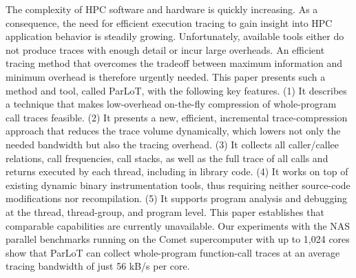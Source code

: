 The complexity of HPC software and hardware is quickly increasing. As a consequence, the need for efficient execution tracing to gain insight into HPC application behavior is steadily growing. Unfortunately, available tools either do not produce traces with enough detail or incur large overheads. An efficient tracing method that overcomes the tradeoff between maximum information and minimum overhead is therefore urgently needed. This paper presents such a method and tool, called ParLoT, with the following key features. (1) It describes a technique that makes low-overhead on-the-fly compression of whole-program call traces feasible. (2) It presents a new, efficient, incremental trace-compression approach that reduces the trace volume dynamically, which lowers not only the needed bandwidth but also the tracing overhead. (3) It collects all caller/callee relations, call frequencies, call stacks, as well as the full trace of all calls and returns executed by each thread, including in library code. (4) It works on top of existing dynamic binary instrumentation tools, thus requiring neither source-code modifications nor recompilation. (5) It supports program analysis and debugging at the thread, thread-group, and program level. 
This paper establishes that comparable capabilities are currently unavailable. Our experiments with the NAS parallel benchmarks running on the Comet supercomputer with up to 1,024 cores show that ParLoT can collect whole-program function-call traces at an average tracing bandwidth of just 56 kB/s per core.
